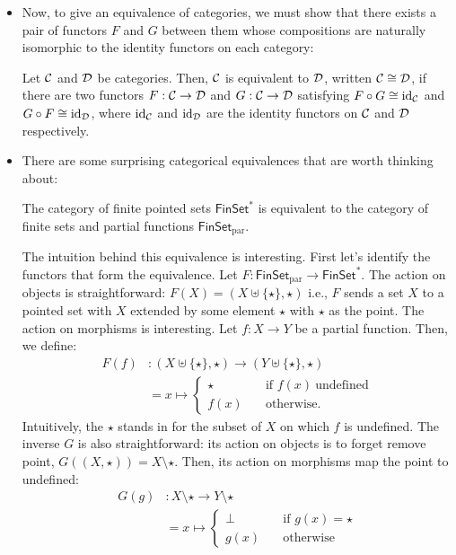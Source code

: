 \begin{itemize}
  \item Now, to give an equivalence of categories, we must show that there exists a pair of functors $F$ and 
  $G$ between them whose compositions are naturally isomorphic to 
  the identity functors on each category:
  \begin{definition}
    \sloppy
    Let $\mathcal C$ and $\mathcal D$ be categories. Then, $\mathcal C$ is equivalent
    to $\mathcal D$, written $\mathcal C \cong \mathcal D$, if there are two functors 
    $F : \mathcal C \to \mathcal D$ and $G: \mathcal C \to \mathcal D$ satisfying
    $F \circ G \cong \operatorname{id}_\mathcal C$ and $G \circ F \cong \operatorname{id}_\mathcal D$, where $\operatorname{id}_\mathcal C$ 
    and $\operatorname{id}_\mathcal D$ are the identity functors on $\mathcal C$ and $\mathcal D$ respectively.
  \end{definition}
  \item There are some surprising categorical equivalences that are worth 
  thinking about:
  \begin{proposition}
    The category of finite pointed sets $\mathsf{FinSet}^*$ is equivalent to the category 
    of finite sets and partial functions $\mathsf{FinSet}_\text{par}$. 
  \end{proposition}

  The intuition behind this equivalence is interesting. First let's identify 
  the functors that form the equivalence. Let $F :
  \mathsf{FinSet}_\text{par} \to \mathsf{FinSet}^*$. The action 
  on objects is straightforward: $F(X) = (X \uplus \{\star\}, \star)$
  i.e., $F$ sends a set $X$ to a pointed set with $X$ extended by 
  some element $\star$ with $\star$ as the point.
  The action on morphisms is interesting. Let $f : X \to Y$ be a partial 
  function. Then, we define:
  \begin{align*}
    F(f) &: (X \uplus \{\star\}, \star) \to (Y \uplus \{\star\}, \star) \\
    &= x \mapsto \begin{cases}
      \star \quad& \text{if }f(x)~\text{undefined} \\ 
      f(x) \quad& \text{otherwise.}
    \end{cases}
  \end{align*}
  Intuitively, the $\star$ stands in for the subset of $X$ on which $f$ is undefined.
  The inverse $G$ is also straightforward: its action on objects is to 
  forget remove point, $G((X, \star)) = X \setminus \star$. Then, its action on morphisms
  map the point to undefined:
  \begin{align*}
    G(g) &: X \setminus \star \to Y \setminus \star \\ 
    &= x \mapsto 
    \begin{cases}
      \bot \quad&\text{if }g(x) = \star \\
      g(x) \quad&\text{otherwise}
    \end{cases}
  \end{align*}


\end{itemize}
